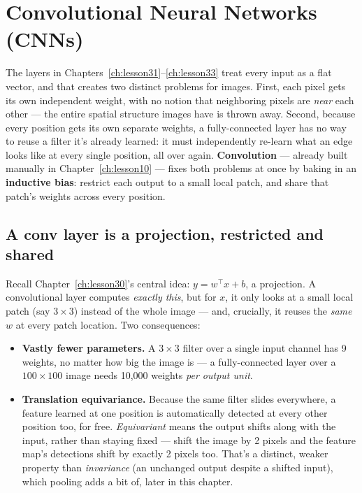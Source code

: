 \chapter{Convolutional Neural Networks (CNNs)}
\label{ch:lesson34}

The layers in Chapters~\ref{ch:lesson31}--\ref{ch:lesson33} treat every input as a flat vector, and that creates two distinct problems for images. First, each pixel gets its own independent weight, with no notion that neighboring pixels are \emph{near} each other --- the entire spatial structure images have is thrown away. Second, because every position gets its own separate weights, a fully-connected layer has no way to reuse a filter it's already learned: it must independently re-learn what an edge looks like at every single position, all over again. \textbf{Convolution} --- already built manually in Chapter~\ref{ch:lesson10} --- fixes both problems at once by baking in an \textbf{inductive bias}: restrict each output to a small local patch, and share that patch's weights across every position.

\section{A conv layer is a projection, restricted and shared}

Recall Chapter~\ref{ch:lesson30}'s central idea: $y=w^\top x+b$, a projection. A convolutional layer computes \emph{exactly this}, but for $x$, it only looks at a small local patch (say $3\times3$) instead of the whole image --- and, crucially, it reuses the \emph{same} $w$ at every patch location. Two consequences:
\begin{itemize}
  \item \textbf{Vastly fewer parameters.} A $3\times3$ filter over a single input channel has 9 weights, no matter how big the image is --- a fully-connected layer over a $100\times100$ image needs 10{,}000 weights \emph{per output unit}.
  \item \textbf{Translation equivariance.} Because the same filter slides everywhere, a feature learned at one position is automatically detected at every other position too, for free. \emph{Equivariant} means the output shifts along with the input, rather than staying fixed --- shift the image by 2 pixels and the feature map's detections shift by exactly 2 pixels too. That's a distinct, weaker property than \emph{invariance} (an unchanged output despite a shifted input), which pooling adds a bit of, later in this chapter.
\end{itemize}

